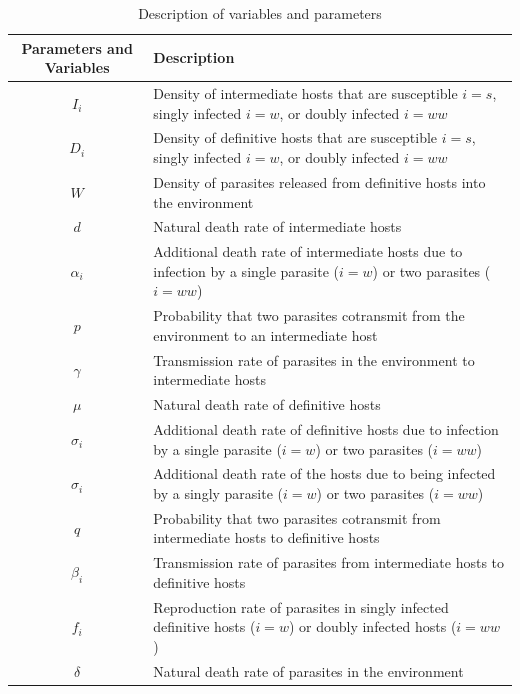 \documentclass[11pt]{article}
\begin{document}
\begin{table}[!ht]
\caption{Description of variables and parameters}
\label{table:varpardescription}
\centering
\begin{tabular}{c|p{10cm}}%
\hline
Parameters and Variables    &  Description  \\
\hline
$I_i$  & Density of intermediate hosts that are susceptible $i=s$, singly infected $i=w$, or doubly infected $i=ww$ \\
\hline
$D_i$ & Density of definitive hosts that are susceptible $i=s$, singly infected $i=w$, or doubly infected $i=ww$ \\
\hline
$W$ & Density of parasites released from definitive hosts into the environment \\
\hline
$d$ & Natural death rate of intermediate hosts \\
\hline
$\alpha_i$ & Additional death rate of intermediate hosts due to infection by a single parasite ($i = w$) or two parasites ($i = ww$) \\
\hline
$p$ & Probability that two parasites cotransmit from the environment to an intermediate host \\
\hline
$\gamma$ & Transmission rate of parasites in the environment to intermediate hosts \\
\hline
$\mu$ & Natural death rate of definitive hosts \\
\hline
$\sigma_i$ & Additional death rate of definitive hosts due to infection by a single parasite ($i = w$) or two parasites ($i = ww$) \\
\hline
$\sigma_i$ & Additional death rate of the hosts due to being infected by a singly parasite ($i = w$) or two parasites ($i = ww$) \\
\hline
$q$ & Probability that two parasites cotransmit from intermediate hosts to definitive hosts \\
\hline
$\beta_i$ & Transmission rate of parasites from intermediate hosts to definitive hosts \\
\hline
$f_i$ & Reproduction rate of parasites in singly infected definitive hosts ($i = w$) or doubly infected hosts ($i = ww$)\\
\hline
$\delta$ & Natural death rate of parasites in the environment \\
\hline
\end{tabular}
\bigskip{}\\
\end{table}

\newpage{}
\end{document}
